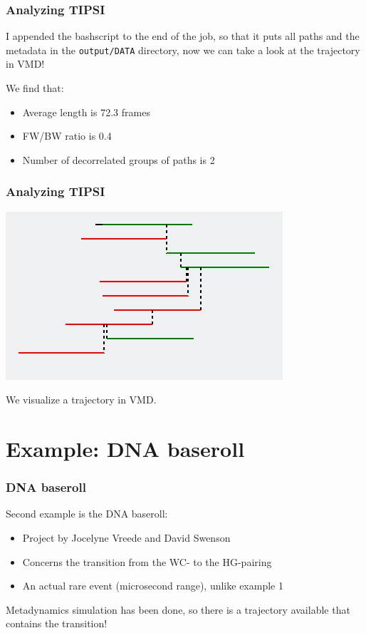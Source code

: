 \documentclass[hyperref={pdfpagelabels=false}]{beamer}
\begin{document}
\begin{frame}
\frametitle{Analyzing \textsc{TIPSI}} 

I appended the bashscript to the end of the job, so that it puts all paths and the metadata in the \texttt{output/DATA} directory, now we can take a look at the trajectory in VMD! 

We find that:

\begin{itemize}
\item Average length is 72.3 frames
\item FW/BW ratio is 0.4
\item Number of decorrelated groups of paths is 2
\end{itemize}

\end{frame}

\begin{frame}
\frametitle{Analyzing \textsc{TIPSI}} 
\begin{center}
\includegraphics[scale=1]{images/tree.png}
\end{center}
We visualize a trajectory in VMD.
\end{frame}

\section{Example: DNA baseroll}
\setcounter{subsection}{1}


\begin{frame}
\frametitle{DNA baseroll} 
Second example is the DNA baseroll:
\begin{itemize}
\item Project by Jocelyne Vreede and David Swenson
\item Concerns the transition from the WC- to the HG-pairing
\item An actual rare event (microsecond range), unlike example 1
\end{itemize}
Metadynamics simulation has been done, so there is a trajectory available that contains the transition!
\end{frame}
\end{document}
